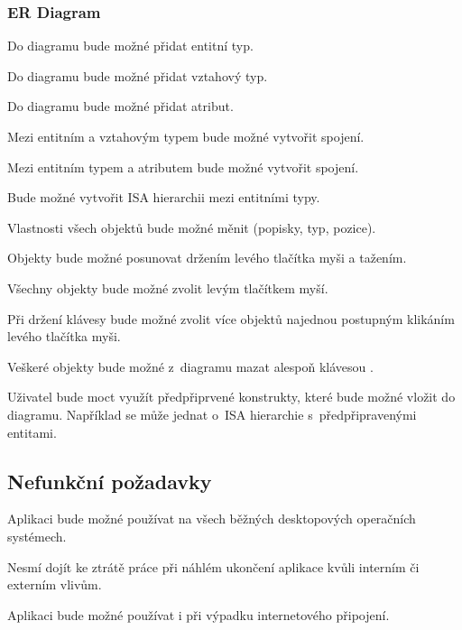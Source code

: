 \subsubsection*{ER Diagram}

\begin{enumfp}[resume]
    \item Do diagramu bude možné přidat entitní typ.
    \item Do diagramu bude možné přidat vztahový typ.
    \item Do diagramu bude možné přidat atribut.
    \item Mezi entitním a vztahovým typem bude možné vytvořit spojení.
    \item Mezi entitním typem a atributem bude možné vytvořit spojení.
    \item Bude možné vytvořit ISA hierarchii mezi entitními typy. 
    \item Vlastnosti všech objektů bude možné měnit (popisky, typ, pozice).
    \item Objekty bude možné posunovat držením levého tlačítka myši a tažením.
    \item Všechny objekty bude možné zvolit levým tlačítkem myší.
    \item Při držení klávesy \keys{\ctrl} bude možné zvolit více objektů najednou postupným klikáním levého tlačítka myši.
    \item Veškeré objekty bude možné z~diagramu mazat alespoň klávesou .
    \item Uživatel bude moct využít předpřiprvené konstrukty, které bude možné vložit do diagramu.
        Například se může jednat o~ISA hierarchie s~předpřipravenými entitami.
\end{enumfp}

\subsection{Nefunkční požadavky}

\begin{enumnfp}
    \item Aplikaci bude možné používat na všech běžných desktopových operačních systémech.
    \item Nesmí dojít ke ztrátě práce při náhlém ukončení aplikace kvůli interním či externím vlivům.
    \item Aplikaci bude možné používat i při výpadku internetového připojení.
\end{enumnfp}
